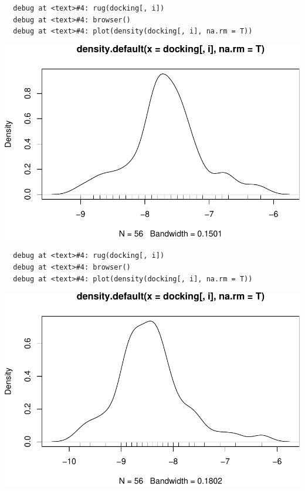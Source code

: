 \documentclass[12pt,twoside]{reedthesis}
\begin{document}
  \begin{verbatim}
  debug at <text>#4: rug(docking[, i])
  debug at <text>#4: browser()
  debug at <text>#4: plot(density(docking[, i], na.rm = T))
  \end{verbatim}
  
  \begin{center}\includegraphics{tesis_files/figure-latex/johan-12} \end{center}
  
  \begin{verbatim}
  debug at <text>#4: rug(docking[, i])
  debug at <text>#4: browser()
  debug at <text>#4: plot(density(docking[, i], na.rm = T))
  \end{verbatim}
  
  \begin{center}\includegraphics{tesis_files/figure-latex/johan-13} \end{center}
  
\end{document}
